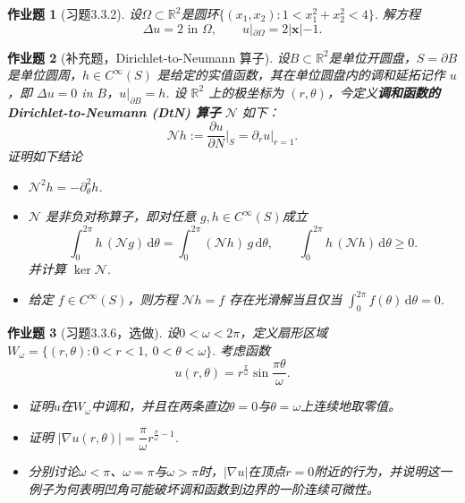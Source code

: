 \documentclass[UTF8,fontset=windows,12pt]{ctexart}
\theoremstyle{kaiti-theorem}
\newtheorem{problem}{作业题}
\numberwithin{equation}{section}
\newcommand{\R}{\mathbb{R}}
\newcommand{\bds}[1]{\boldsymbol{#1}}  %
\newcommand{\Om}{\Omega}
\newcommand{\q}{\quad}
\newcommand{\p}{\partial}
\newcommand{\lap}{\Delta}
\newcommand{\nab}{\nabla}
\newcommand{\NH}{\mathcal{N}}
\newcommand{\xx}{{\bds{x}}}
\begin{document}
\begin{problem}[习题3.3.2]
设$\Om\subset\R^2$是圆环$\{(x_1,x_2):1<x_1^2+x_2^2<4\}$. 解方程
\[
\lap u=2\text{ in }\Om,\q\q u|_{\p\Om}=2|\xx|-1.
\]
\end{problem}

\begin{problem}[补充题，Dirichlet-to-Neumann 算子]
设$B\subset\R^2$是单位开圆盘，$S=\p B$是单位圆周，$h\in C^\infty(S)$ 是给定的实值函数，其在单位圆盘内的调和延拓记作 $u$，即 $\lap u=0$ in $B$，$u|_{\p B}=h$. 设 $\R^2$ 上的极坐标为 $(r,\theta)$，今定义\textbf{调和函数的 Dirichlet-to-Neumann (DtN) 算子} $\NH$ 如下： $$\NH h:=\dfrac{\p u}{\p N}\bigg|_{S}=\p_r u|_{r=1}.$$ 
证明如下结论
\begin{itemize}
\item [(1)] $\NH^2h=-\p_\theta^2h$.
\item [(2)]  $\NH$ 是非负对称算子，即对任意 $g,h\in C^\infty(S)$成立 $$\int_0^{2\pi} h\,(\NH g)\,\mathrm{d}\theta = \int_0^{2\pi} (\NH h)\, g\,\mathrm{d}\theta,\qquad \int_0^{2\pi} h\,(\NH h)\,\mathrm{d}\theta\geqslant 0.$$ 并计算 $\ker \NH$.
\item [(3)] 给定 $f\in C^\infty(S)$，则方程 $\NH h = f$ 存在光滑解当且仅当 $\int_0^{2\pi}f(\theta)\,\mathrm{d}\theta = 0$.
\end{itemize}
\end{problem}

\begin{problem}[习题3.3.6，选做] 
设$0<\omega<2\pi$，定义扇形区域 $W_\omega=\{(r,\theta):0<r<1,\ 0<\theta<\omega\}.$ 考虑函数
\[
u(r,\theta)=r^{\frac{\pi}{\omega}}\sin\frac{\pi\theta}{\omega}.
\]
\begin{itemize}
\item[(1)] 证明$u$在$W_\omega$中调和，并且在两条直边$\theta=0$与$\theta=\omega$上连续地取零值。

\item[(2)] 证明 $|\nab u(r,\theta)|=\dfrac{\pi}{\omega}r^{\frac{\pi}{\omega}-1}$.

\item[(3)] 分别讨论$\omega<\pi$、$\omega=\pi$与$\omega>\pi$时，$|\nab u|$在顶点$r=0$附近的行为，并说明这一例子为何表明凹角可能破坏调和函数到边界的一阶连续可微性。
\end{itemize}
\end{problem}
\end{document}

